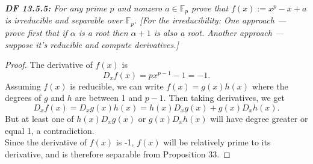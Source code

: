 \documentclass{article}
\begin{document}
\it \textbf{DF 13.5.5:} For any prime $p$ and nonzero $a\in\mathbb{F}_p$
  prove that $f(x):=x^p-x+a$ is irreducible and separable over $\mathbb{F}_p$.
  [For the irreducibility: One approach --- prove first that if $\alpha$ is
  a root then $\alpha+1$  is also a root. Another approach --- suppose it's
  reducible and compute derivatives.]

  \begin{proof}
    The derivative of $f(x)$ is
    \[D_x f(x) =px^{p-1}-1 =-1.\]
    Assuming $f(x)$ is reducible, we can write $f(x)=g(x)h(x)$ where the
    degrees of $g$ and $h$ are between 1 and $p-1$. Then taking
    derivatives, we get
    \[D_x f(x) =D_x g(x)h(x) =h(x)D_x g(x) +g(x)D_x h(x).\]
    But at least one of $h(x)D_x g(x)$ or $g(x)D_x h(x)$ will have degree
    greater or equal 1, a contradiction. \\

    Since the derivative of $f(x)$ is -1, $f(x)$ will be relatively prime
    to its derivative, and is therefore separable from Proposition 33.
  \end{proof}
\end{document}
